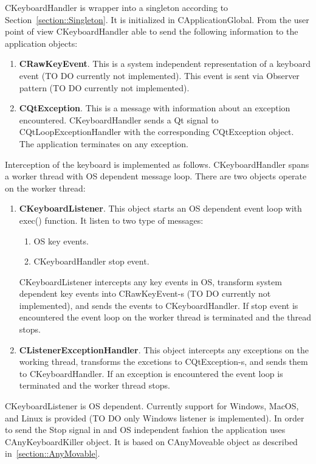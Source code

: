 \documentclass{article}
\begin{document}
CKeyboardHandler is wrapper into a singleton according to Section~\ref{section::Singleton}. It is initialized in CApplicationGlobal. From the user point of view CKeyboardHandler able to send the following information to the application objects:
\begin{enumerate}
\item \textbf{CRawKeyEvent}. This is a system independent representation of a keyboard event (TO DO currently not implemented). This event is sent via Observer pattern (TO DO currently not implemented).

\item \textbf{CQtException}. This is a message with information about an exception encountered. CKeyboardHandler sends a Qt signal to CQtLoopExceptionHandler with the corresponding CQtException object. The application terminates on any exception.
\end{enumerate}

Interception of the keyboard is implemented as follows. CKeyboardHandler spans a worker thread with OS dependent message loop. There are two objects operate on the worker thread:
\begin{enumerate}
\item \textbf{CKeyboardListener}. This object starts an OS dependent event loop with exec() function. It listen to two type of messages:
\begin{enumerate}
\item OS key events.
\item CKeyboardHandler stop event.
\end{enumerate}
CKeyboardListener intercepts any key events in OS, transform system dependent key events into CRawKeyEvent-s (TO DO currently not implemented), and sends the events to CKeyboardHandler. If stop event is encountered the event loop on the worker thread is terminated and the thread stops.

\item \textbf{CListenerExceptionHandler}. This object intercepts any exceptions on the working thread, transforms the excetions to CQtException-s, and sends them to CKeyboardHandler. If an exception is encountered the event loop is terminated and the worker thread stops.
\end{enumerate}

CKeyboardListener is OS dependent. Currently support for Windows, MacOS, and Linux is provided (TO DO only Windows listener is implemented). In order to send the Stop signal in and OS independent fashion the application uses CAnyKeyboardKiller object. It is based on CAnyMoveable object as described in~\ref{section::AnyMovable}.
\end{document}
